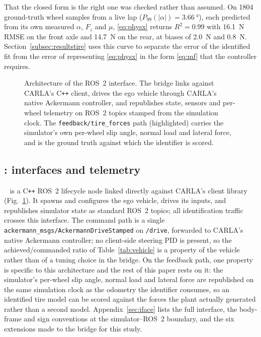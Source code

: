 That the closed form is the right one was checked rather than assumed. On 1804
ground-truth wheel samples from a live lap ($P_{99}(|\alpha|)=\SI{3.66}{\degree}$),
each predicted from its own measured $\alpha$, $F_{z}$ and $\mu$,
\eqref{eq:physx} returns $R^{2}=\num{0.99}$ with \SI{16.1}{\newton} RMSE on the
front axle and \SI{14.7}{\newton} on the rear, at biases of \SI{+2.0}{\newton}
and \SI{+0.8}{\newton}. Section~\ref{subsec:resultstire} uses this curve to
separate the error of the identified fit from the error of representing
\eqref{eq:physx} in the form \eqref{eq:mf} that the controller requires.

\begin{figure}[t]
\centering
\resizebox{\textwidth}{!}{}
\caption{Architecture of the \bridge{} ROS~2 interface. The bridge links
against CARLA's C\texttt{++} client, drives the ego vehicle through CARLA's
native Ackermann controller, and republishes state, sensors and per-wheel
telemetry on ROS~2 topics stamped from the simulation clock. The
\texttt{feedback/\allowbreak tire\_forces} path (highlighted) carries the
simulator's own per-wheel slip angle, normal load and lateral force, and is the
ground truth against which the identifier is scored.}
\label{fig:bridge}
\end{figure}

\subsection{\textup{\bridge{}}: interfaces and telemetry}
\label{subsec:bridge}

\bridge{}~\cite{carlaasubridge} is a C\texttt{++} ROS~2 lifecycle node linked
directly against CARLA's client library (Fig.~\ref{fig:bridge}). It spawns and
configures the ego vehicle, drives its inputs, and republishes simulator state
as standard ROS~2 topics; all identification traffic crosses this interface.
The command path is a single
\texttt{ack\-er\-mann\_msgs/AckermannDriveStamped} on \texttt{/drive},
forwarded to CARLA's native Ackermann controller; no client-side steering PID
is present, so the achieved/\allowbreak commanded ratio of
Table~\ref{tab:vehicle} is a property of the vehicle rather than of a tuning
choice in the bridge. On the feedback path, one property is specific to this
architecture and the rest of this paper rests on it: the simulator's per-wheel
slip angle, normal load and lateral force are republished on the same
simulation clock as the odometry the identifier consumes, so an identified tire
model can be scored against the forces the plant actually generated rather than
a second model. Appendix~\ref{sec:iface} lists the full interface, the
body-frame and sign conventions at the simulator--ROS~2 boundary, and the six
extensions made to the bridge for this study.

